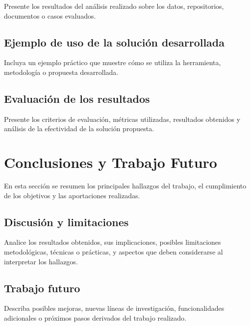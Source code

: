 \documentclass[12pt]{article}
\begin{document}
Presente los resultados del análisis realizado sobre los datos, repositorios, documentos o casos evaluados.

\subsection{Ejemplo de uso de la solución desarrollada}

Incluya un ejemplo práctico que muestre cómo se utiliza la herramienta, metodología o propuesta desarrollada.

\subsection{Evaluación de los resultados}

Presente los criterios de evaluación, métricas utilizadas, resultados obtenidos y análisis de la efectividad de la solución propuesta.

\newpage


\section{Conclusiones y Trabajo Futuro}

En esta sección se resumen los principales hallazgos del trabajo, el cumplimiento de los objetivos y las aportaciones realizadas.

\subsection{Discusión y limitaciones}

Analice los resultados obtenidos, sus implicaciones, posibles limitaciones metodológicas, técnicas o prácticas, y aspectos que deben considerarse al interpretar los hallazgos.

\subsection{Trabajo futuro}

Describa posibles mejoras, nuevas líneas de investigación, funcionalidades adicionales o próximos pasos derivados del trabajo realizado.

\newpage




\end{document}
